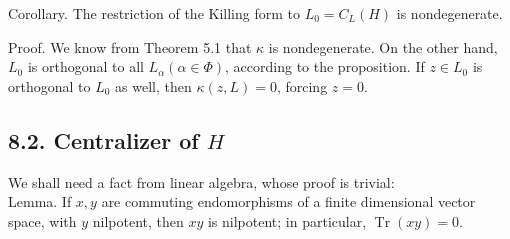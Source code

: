 \documentclass[10pt]{article}
\begin{document}
Corollary. The restriction of the Killing form to $L_{0}=C_{L}(H)$ is nondegenerate.

Proof. We know from Theorem 5.1 that $\kappa$ is nondegenerate. On the other hand, $L_{0}$ is orthogonal to all $L_{\alpha}(\alpha \in \Phi)$, according to the proposition. If $z \in L_{0}$ is orthogonal to $L_{0}$ as well, then $\kappa(z, L)=0$, forcing $z=0$.

\subsection*{8.2. Centralizer of $H$}
We shall need a fact from linear algebra, whose proof is trivial:\\
Lemma. If $x, y$ are commuting endomorphisms of a finite dimensional vector space, with $y$ nilpotent, then $x y$ is nilpotent; in particular, $\operatorname{Tr}(x y)=0$.
\end{document}
